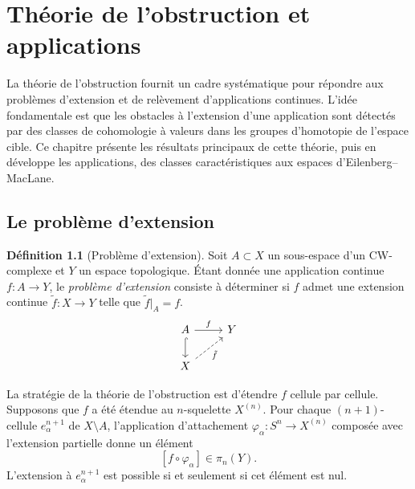 \documentclass[12pt,a4paper,openany]{book}
\theoremstyle{definition}
\newtheorem{definition}{Définition}[chapter]
\theoremstyle{plain}
\theoremstyle{remark}
\begin{document}
\chapter{Théorie de l'obstruction et applications}\label{chap:obstruction}

La théorie de l'obstruction fournit un cadre systématique pour répondre aux
problèmes d'extension et de relèvement d'applications continues. L'idée
fondamentale est que les obstacles à l'extension d'une application sont
détectés par des classes de cohomologie à valeurs dans les groupes d'homotopie
de l'espace cible. Ce chapitre présente les résultats principaux de cette
théorie, puis en développe les applications, des classes caractéristiques aux
espaces d'Eilenberg--MacLane.

\section{Le problème d'extension}\label{sec:probleme-extension}

\begin{definition}[Problème d'extension]\label{def:probleme-extension}
  Soit $A \subset X$ un sous-espace d'un CW-complexe et $Y$ un espace topologique.
  Étant donnée une application continue $f \colon A \to Y$, le \emph{problème
  d'extension} consiste à déterminer si $f$ admet une extension continue
  $\tilde{f} \colon X \to Y$ telle que $\tilde{f}|_A = f$.
  \[
    \begin{tikzcd}
      A \ar[r, "f"] \ar[d, hookrightarrow] & Y \\
      X \ar[ur, dashed, "\tilde{f}"']
    \end{tikzcd}
  \]
\end{definition}

La stratégie de la théorie de l'obstruction est d'étendre $f$ cellule par cellule.
Supposons que $f$ a été étendue au $n$-squelette $X^{(n)}$. Pour chaque
$(n+1)$-cellule $e_\alpha^{n+1}$ de $X \setminus A$, l'application d'attachement
$\varphi_\alpha \colon S^n \to X^{(n)}$ composée avec l'extension partielle donne
un élément
\[
  [f \circ \varphi_\alpha] \in \pi_n(Y).
\]
L'extension à $e_\alpha^{n+1}$ est possible si et seulement si cet élément est nul.
\end{document}
